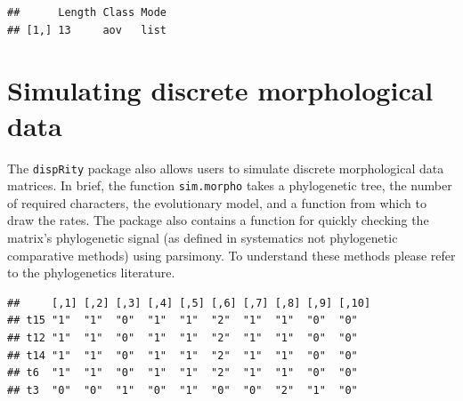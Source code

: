 \documentclass[]{book}
\newenvironment{Shaded}{\begin{snugshade}}{\end{snugshade}}
\newcommand{\KeywordTok}[1]{\textcolor[rgb]{0.13,0.29,0.53}{\textbf{#1}}}
\newcommand{\DataTypeTok}[1]{\textcolor[rgb]{0.13,0.29,0.53}{#1}}
\newcommand{\DecValTok}[1]{\textcolor[rgb]{0.00,0.00,0.81}{#1}}
\newcommand{\FloatTok}[1]{\textcolor[rgb]{0.00,0.00,0.81}{#1}}
\newcommand{\StringTok}[1]{\textcolor[rgb]{0.31,0.60,0.02}{#1}}
\newcommand{\OtherTok}[1]{\textcolor[rgb]{0.56,0.35,0.01}{#1}}
\newcommand{\OperatorTok}[1]{\textcolor[rgb]{0.81,0.36,0.00}{\textbf{#1}}}
\newcommand{\NormalTok}[1]{#1}
\theoremstyle{definition}
\theoremstyle{definition}
\theoremstyle{remark}
\begin{document}
\begin{verbatim}
##      Length Class Mode
## [1,] 13     aov   list
\end{verbatim}

\section{Simulating discrete morphological
data}\label{simulating-discrete-morphological-data}

The \texttt{dispRity} package also allows users to simulate discrete
morphological data matrices. In brief, the function \texttt{sim.morpho}
takes a phylogenetic tree, the number of required characters, the
evolutionary model, and a function from which to draw the rates. The
package also contains a function for quickly checking the matrix's
phylogenetic signal (as defined in systematics not phylogenetic
comparative methods) using parsimony. To understand these methods please
refer to the phylogenetics literature.

\begin{Shaded}
\end{Shaded}

\begin{verbatim}
##     [,1] [,2] [,3] [,4] [,5] [,6] [,7] [,8] [,9] [,10]
## t15 "1"  "1"  "0"  "1"  "1"  "2"  "1"  "1"  "0"  "0"  
## t12 "1"  "1"  "0"  "1"  "1"  "2"  "1"  "1"  "0"  "0"  
## t14 "1"  "1"  "0"  "1"  "1"  "2"  "1"  "1"  "0"  "0"  
## t6  "1"  "1"  "0"  "1"  "1"  "2"  "1"  "1"  "0"  "0"  
## t3  "0"  "0"  "1"  "0"  "1"  "0"  "0"  "2"  "1"  "0"
\end{verbatim}
\end{document}
